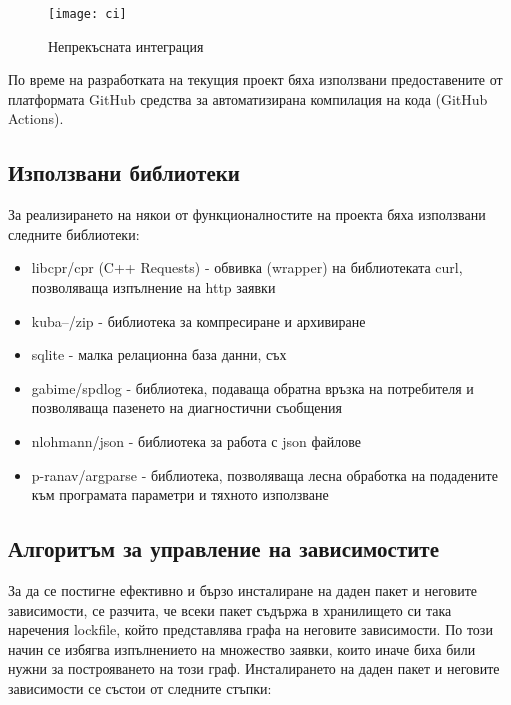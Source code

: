 \begin{figure}[h]
    \centering
    \texttt{[image: ci]}
    \caption{Непрекъсната интеграция}
    \label{fig:ci}
\end{figure}

По време на разработката на текущия проект бяха използвани предоставените от
платформата GitHub средства за автоматизирана компилация на кода (GitHub
Actions).


\subsection{Използвани библиотеки}

За реализирането на някои от функционалностите на проекта бяха използвани
следните библиотеки:

\begin{itemize}
    \item libcpr/cpr (C++ Requests) - обвивка (wrapper) на библиотеката curl,
          позволяваща изпълнение на \acrshort{http} заявки \cite{cpr}
    \item kuba--/zip - библиотека за компресиране и архивиране
    \item sqlite - малка релационна база данни, съх
          \cite{sqlite}
    \item gabime/spdlog - библиотека, подаваща обратна връзка на потребителя и
          позволяваща пазенето на диагностични съобщения
    \item nlohmann/json - библиотека за работа с \acrshort{json} файлове
          \cite{json}
    \item p-ranav/argparse - библиотека, позволяваща лесна обработка на
          подадените към програмата параметри и тяхното използване
\end{itemize}


\subsection{Алгоритъм за управление на зависимостите}

За да се постигне ефективно и бързо инсталиране на даден пакет и неговите
зависимости, се разчита, че всеки пакет съдържа в хранилището си така наречения
lockfile, който представлява графа на неговите зависимости. По този начин се
избягва изпълнението на множество заявки, които иначе биха били нужни за
построяването на този граф. Инсталирането на даден пакет и неговите зависимости
се състои от следните стъпки:

